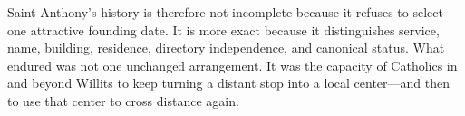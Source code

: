 Saint Anthony's history is therefore not incomplete because it refuses to select one attractive founding date. It is more exact because it distinguishes service, name, building, residence, directory independence, and canonical status. What endured was not one unchanged arrangement. It was the capacity of Catholics in and beyond Willits to keep turning a distant stop into a local center---and then to use that center to cross distance again.
